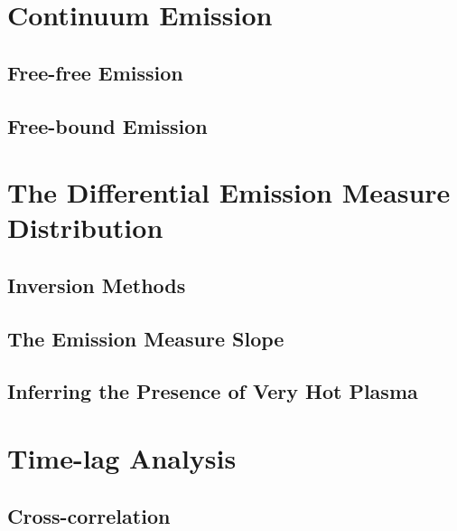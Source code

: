 \section{Continuum Emission}\label{sec:continuum}


\subsection{Free-free Emission}

\subsection{Free-bound Emission}

\section{The Differential Emission Measure Distribution}\label{sec:dem}


\subsection{Inversion Methods}

\subsection{The Emission Measure Slope}

\subsection{Inferring the Presence of Very Hot Plasma}

\section{Time-lag Analysis}\label{sec:timelag}


\subsection{Cross-correlation}

